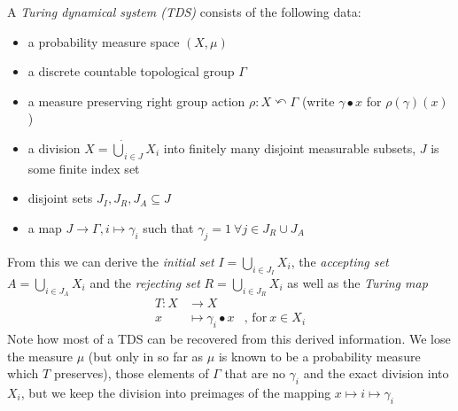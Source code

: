 \begin{Definition}
	A \emph{Turing dynamical system (TDS)} consists of the following data:
	\begin{itemize}
		\item{a probability measure space $(X,\mu)$}
		\item{a discrete countable topological group $\Gamma$}
		\item{a measure preserving right group action $\rho : X \curvearrowleft \Gamma$ (write $\gamma \bullet x$ for $\rho(\gamma)(x)$)}
		\item{a division $X = \dot\bigcup_{i \in J} X_i$ into finitely many disjoint measurable subsets, $J$ is some finite index set}
		\item{disjoint sets $J_I, J_R, J_A \subseteq J$}
		\item{a map $J \to \Gamma, i \mapsto \gamma_i$ such that $\gamma_j = 1~\forall j \in J_R \cup J_A$}
	\end{itemize}
\end{Definition}
From this we can derive the \emph{initial set} $I = \bigcup_{i\in J_I} X_i$, the \emph{accepting set} $A = \bigcup_{i \in J_A} X_i$ and the \emph{rejecting set} $R = \bigcup_{i \in J_R} X_i$ as well as the \emph{Turing map}
\begin{align*}
	T : X &\to X \\
	x &\mapsto \gamma_i \bullet x&\text{, for}~x \in X_i
\end{align*}
Note how most of a TDS can be recovered from this derived information.
We lose the measure $\mu$ (but only in so far as $\mu$ is known to be a probability measure which $T$ preserves),
those elements of $\Gamma$ that are no $\gamma_i$
and the exact division into $X_i$, but we keep the division into preimages of the mapping $x \mapsto i \mapsto \gamma_i$
